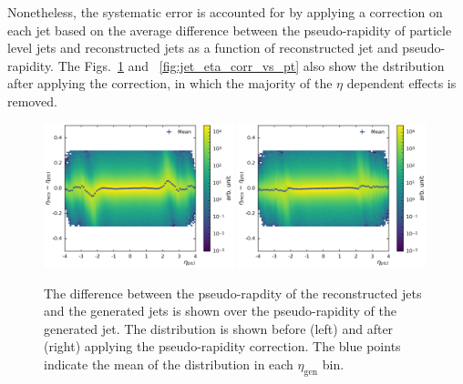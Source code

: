 Nonetheless, the systematic error is accounted for by applying a correction on
each jet based on the average difference between the pseudo-rapidity of
particle level jets and reconstructed jets as a function of reconstructed jet
\pt and pseudo-rapidity. The Figs.~\ref{fig:jet_eta_corr} and
~\ref{fig:jet_eta_corr_vs_pt} also show the dstribution after applying the
correction, in which the majority of the $\eta$ dependent effects is removed.

\begin{figure}[htbp]
    \centering
    \includegraphics[width=0.49\textwidth]{figures/measurement/genvsreco_eta.pdf}\hfill
    \includegraphics[width=0.49\textwidth]{figures/measurement/genvsreco_eta_corr.pdf}
    \caption[Differences of pseudo-rapidity of reconstructed jets to
        generator-level jets]{The difference between the pseudo-rapdity of the
            reconstructed jets and the generated jets is shown over the
            pseudo-rapidity of the generated jet. The distribution is shown
            before (left) and after (right) applying the pseudo-rapidity
            correction. The blue points indicate the mean of the distribution in
            each $\eta_{\mathrm{gen}}$ bin.}
    \label{fig:jet_eta_corr}
\end{figure}



